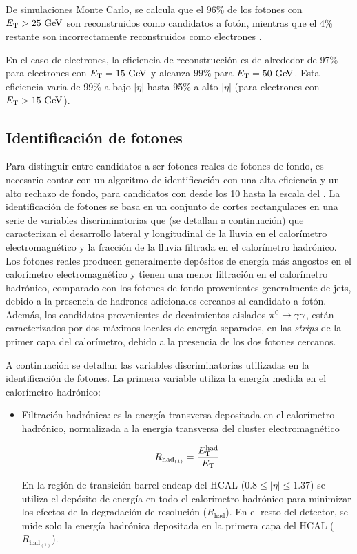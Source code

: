 De simulaciones Monte Carlo, se calcula que el 96\% de los fotones con
$\et>25\gev$ son reconstruidos como candidatos a fotón, mientras que el 4\%
restante son incorrectamente reconstruidos como electrones \cite{Delmastro:1747242}.

En el caso de electrones, la eficiencia de reconstrucción es de alrededor de
97\% para electrones con $\et=15 \gev$ y alcanza $99 \%$ para $\et=50\gev$. Esta
eficiencia varia de 99\% a bajo $|\eta|$ hasta 95\% a alto $|\eta|$ (para
electrones con $\et>15 \gev$)\cite{ATLAS-CONF-2014-032}.


\subsection{Identificación de fotones}
\label{sec:fotones}

Para distinguir entre candidatos a ser fotones reales de fotones de fondo, es
necesario contar con un algoritmo de identificación con una alta eficiencia y un alto rechazo
de fondo, para candidatos con {\et} desde los 10 {\gev} hasta la escala del
{\tev}. La identificación de fotones se basa en un conjunto de cortes
rectangulares en una serie de variables discriminatorias que (se detallan a continuación)
que caracterizan el desarrollo lateral y longitudinal de la
lluvia en el calorímetro electromagnético y la fracción de la lluvia filtrada en
el calorímetro hadrónico. Los fotones reales producen generalmente depósitos de
energía más angostos en el calorímetro electromagnético y tienen una menor
filtración en el calorímetro hadrónico, comparado con los fotones de fondo
provenientes generalmente de jets, debido a la presencia de hadrones adicionales cercanos al
candidato a fotón. Además, los candidatos provenientes de
decaimientos aislados $\pi^0 \to \gam\gam$, están caracterizados por dos máximos
locales de energía separados, en las \emph{strips} de la primer capa del calorímetro,
debido a la presencia de los dos fotones cercanos.

A continuación se detallan las variables discriminatorias utilizadas en la identificación de fotones. La primera
 variable utiliza la energía medida en el calorímetro hadrónico:

\begin{itemize}\itemsep0.2cm\parskip0.2cm

\item Filtración hadrónica: es la energía transversa depositada en el
  calorímetro hadrónico, normalizada a la energía transversa del cluster
  electromagnético

  \begin{equation}
    R_{\mathrm{had}_{(1)}} = \frac{E_{\mathrm{T}}^{\mathrm{had}}}{E_{\mathrm{T}}}
  \end{equation}

  En la región de transición barrel-endcap del HCAL ($0.8\leq |\eta| \leq 1.37$) se utiliza
  el depósito de energía en todo el calorímetro hadrónico para minimizar los efectos de la
  degradación de resolución ($R_{\mathrm{had}}$). En el resto del detector, se mide solo la
  energía hadrónica depositada en la primera capa del HCAL ($R_{\mathrm{had}_{(1)}}$).
\end{itemize}

